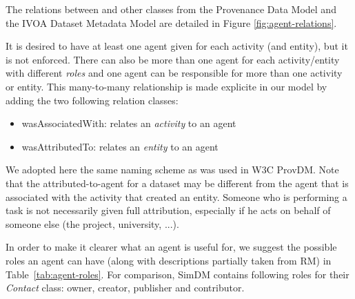 The relations between  and other classes from the Provenance Data Model and
the IVOA Dataset Metadata Model are detailed in Figure \ref{fig:agent-relations}.

It is desired to have at least one agent given for each activity (and entity), but it
is not enforced.
There can also be more than one agent for each activity/entity with different \emph{roles} 
and one agent can be responsible for more than one activity or entity. This 
many-to-many relationship is made explicite in our model by adding the two
following relation classes:

\begin{itemize}
\item wasAssociatedWith: relates an \emph{activity} to an agent
\item wasAttributedTo: relates an \emph{entity} to an agent
\end{itemize}

We adopted here the same naming scheme as was used in W3C ProvDM.
Note that the attributed-to-agent for a dataset may be different from the 
agent that is associated with the activity that created an entity. 
Someone who is performing a task is not necessarily given full attribution, 
especially if he acts on behalf of someone else (the project, university, ...).

In order to make it clearer what an agent is useful for, we suggest the
possible roles an agent can have (along with descriptions partially taken from RM)
in Table~\ref{tab:agent-roles}. 
For comparison, SimDM contains following roles 
for their \emph{Contact} class: 
owner, creator, publisher and contributor.


